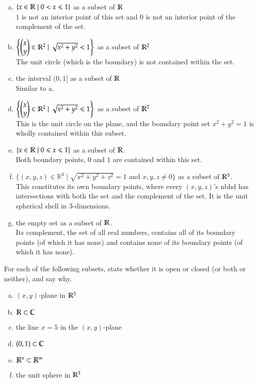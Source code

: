 \begin{enumerate}[a.]
	\item $\left\{ x\in \mathbb{R} \mid 0<x \leqslant 1 \right\}$ as a subset of $\mathbb{R}$ \\
	 $1$ is not an interior point of this set and $0$ is not an interior point of the complement of the set.
	\item $\left\{ \begin{pmatrix} x \\ y \end{pmatrix}\in \mathbb{R}^2 \mid \sqrt{x^2+y^2}< 1 \right\}$ as a subset of $\mathbb{R}^2$ \\
	 The unit circle (which is the boundary) is not contained within the set.
	\item the interval $(0,1]$ as a subset of $\mathbb{R}$ \\
	 Similar to a.
	\item $\left\{ \begin{pmatrix} x \\ y \end{pmatrix}\in \mathbb{R}^2 \mid \sqrt{x^2+y^2}\leqslant 1 \right\}$ as a subset of $\mathbb{R}^2$ \\
	 This is the unit circle on the plane, and the boundary point set $x^2+y^2=1$ is wholly contained within this subset. 
	
	\item $\{x\in\mathbb{R}\mid 0\leqslant x\leqslant 1\}$ as a subset of $\mathbb{R}$. \\
	 Both boundary points, $0$ and $1$ are contained within this set. 
	
	\item $\{(x,y,z)\in\mathbb R^3 \mid \sqrt{x^2+y^2+z^2}=1 \text{ and }x,y,z\neq 0\}$ as a subset of $\mathbb{R}^3$. \\
	 This constitutes its own boundary points, where every $(x,y,z)$'s nbhd has intersections with both the set and the complement of the set. It is the unit spherical shell in 3-dimensions. 
	
	\item the empty set as a subset of $\mathbb{R}$. \\
	 Its complement, the set of all real numbers, contains all of its boundary points (of which it has none) and contains none of its boundary points (of which it has none). 
\end{enumerate}


For each of the following subsets, state whether it is open or closed (or both or neither), and say why.
\begin{enumerate}[a.]
\item $(x,y)$-plane in $\mathbb{R}^3$
\item $\mathbb{R}\subset \mathbb{C}$
\item the line $x=5$ in the $(x,y)$-plane
\item $(0,1)\subset \mathbb{C}$
\item $\mathbb{R}^n\subset \mathbb{R}^m$
\item the unit sphere in $\mathbb{R}^3$
\end{enumerate}

